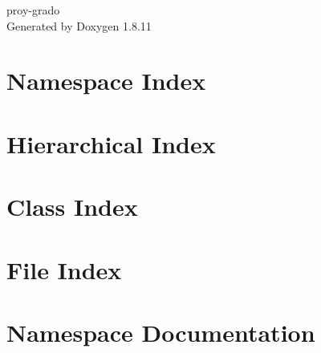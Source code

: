 \documentclass[twoside]{book}
\newcommand{\+}{\discretionary{\mbox{\scriptsize$\hookleftarrow$}}{}{}}
\newcommand{\clearemptydoublepage}{%
  \newpage{\pagestyle{empty}\cleardoublepage}%
}
\begin{document}
\hypersetup{pageanchor=false,
             bookmarksnumbered=true,
             pdfencoding=unicode
            }
\begin{titlepage}
\vspace*{7cm}
\begin{center}%
{\Large proy-\/grado }\\
\vspace*{1cm}
{\large Generated by Doxygen 1.8.11}\\
\end{center}
\end{titlepage}
\clearemptydoublepage
\tableofcontents
\clearemptydoublepage
{}
\hypersetup{pageanchor=true}

\chapter{Namespace Index}

\chapter{Hierarchical Index}

\chapter{Class Index}

\chapter{File Index}

\chapter{Namespace Documentation}







\end{document}
